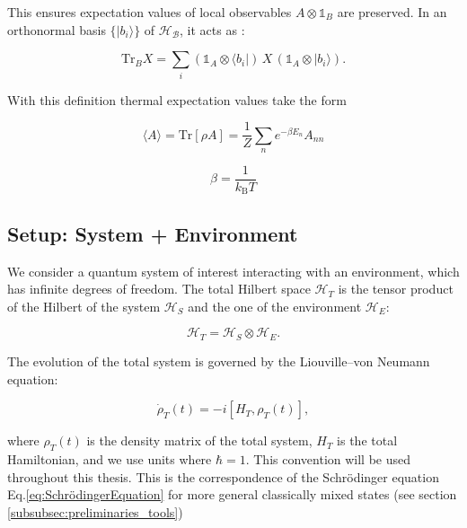 \noindent
This ensures expectation values of local observables $A \otimes \mathds{1}_B$ are preserved. In an orthonormal basis $\{|b_i\rangle\}$ of $\mathcal{H_B}$, it acts as \cite{steebhardy2018problemssolutionsquantum}:

\begin{equation} \label{eq:ho_partial_trace_definition}
	\mathrm{Tr}_B X = \sum_i (\mathds{1}_A \otimes \langle b_i|) \, X \, (\mathds{1}_A \otimes |b_i\rangle).
\end{equation}

\noindent
With this definition thermal expectation values take the form

\begin{equation} \label{eq:ho_expectation_value} \langle A \rangle = \mathrm{Tr}[\rho A] = \frac{1}{Z} \sum_n e^{-\beta E_n} A_{nn}
\end{equation}

\begin{equation} \label{eq:ho_beta_definition}
	\beta = \frac{1}{k_{\mathrm{B}} T}
\end{equation}


\subsection{Setup: System + Environment}

\noindent
We consider a quantum system of interest interacting with an environment, which has infinite degrees of freedom. The total Hilbert space $\mathcal{H}_T$ is the tensor product of the Hilbert of the system $\mathcal{H}_S$ and the one of the environment $\mathcal{H}_E$:

\begin{equation}
	\mathcal{H}_T = \mathcal{H}_S \otimes \mathcal{H}_E.
	\label{eq:Total_Hilbert_Space}
\end{equation}

\noindent
The evolution of the total system is governed by the Liouville–von Neumann equation:

\begin{equation}
	\dot{\rho}_T(t) = -i[H_T, \rho_T(t)],
	\label{eq:Von_Neumann_Equation}
\end{equation}

\noindent
where $\rho_T(t)$ is the density matrix of the total system, $H_T$ is the total Hamiltonian, and we use units where $\hbar = 1$. This convention will be used throughout this thesis. This is the correspondence of the Schrödinger equation Eq.\eqref{eq:SchrödingerEquation} for more general classically mixed states (see section \ref{subsubsec:preliminaries_tools})

